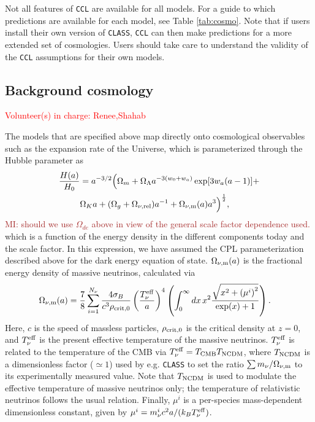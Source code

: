 \documentclass[\docopts]{\docclass}
\newcommand{\todo}[1]{\textcolor{magenta}{To do: #1}}
\newcommand{\vol}[1]{\textcolor{red}{Volunteer(s) in charge: #1}}
\newcommand{\mi}[1]{\textcolor{brown}{MI: #1}}
\newcommand{\ccl}{{\tt CCL}\xspace}
\begin{document}
Not all features of \ccl are available for all models. For a guide to which predictions are available for each model, see Table \ref{tab:cosmo}. Note that if users install their own version of {\tt CLASS}, {\tt CCL} can then make predictions for a more extended set of cosmologies. Users should take care to understand the validity of the {\tt CCL} assumptions for their own models.




\subsection{Background cosmology}
\vol{Renee,Shahab}

The models that are specified above map directly onto cosmological observables such as the expansion rate of the Universe, which is parameterized through the Hubble parameter as
\begin{align}\label{eq:Ha}
\frac{H(a)}{H_0} &= a^{-3/2}\Big(\Omega_{m}+\Omega_{\Lambda} a^{-3(w_0+w_a)}
    \exp[3 w_a (a-1)]+\nonumber \\ &\Omega_{K} a +(\Omega_{g} + \Omega_{\nu, {\rm rel}}) a^{-1} + \Omega_{\nu, {\rm m}}(a)a^3\Big)^{\frac{1}{2}} ,
\end{align}
\mi{should we use $\Omega_{de}$ above in view of the general scale factor dependence used.}
which is a function of the energy density in the different components today and the scale factor. In this expression, we have assumed the CPL parameterization described above for the dark energy equation of state. $\Omega_{\nu, {\rm m}}(a)$ is the fractional energy density of massive neutrinos, calculated via
\begin{align}
\Omega_{\nu, {\rm m}}(a) &= \frac{7}{8}\sum_{i=1}^{N_\nu} \frac{4 \sigma_{B}}{c^3 \rho_{{\rm crit},0}} \left(\frac{T_{\nu}^{\rm eff}}{a}\right)^4  \left(\int_0^{\infty} dx \, x^2 \frac{\sqrt{x^2 + \left(\mu^i\right)^2}}{\exp(x) + 1}\right).
\label{Omnu}
\end{align}
Here, $c$ is the speed of massless particles, $\rho_{{\rm crit},0}$ is the critical density at $z=0$, and $T_{\nu}^{\rm eff}$ is the present effective temperature of the massive neutrinos. $T_{\nu}^{\rm eff}$ is related to the temperature of the CMB via $T_{\nu}^{\rm eff} = T_{\rm CMB} T_{\rm NCDM}$, where $T_{\rm NCDM}$ is a dimensionless factor ($\simeq1$) used by e.g. {\tt CLASS} to set the ratio ${\sum m_\nu}/{\Omega_{\nu, {\rm m}}}$ to its experimentally measured value. Note that $T_{\rm NCDM}$ is used to modulate the effective temperature of massive neutrinos only; the temperature of relativistic neutrinos follows the usual relation. Finally, $\mu^i$ is a per-species mass-dependent dimensionless constant, given by $\mu^i = m_{\nu}^{i}c^2 a / (k_B T_{\nu}^{\rm eff})$.
\end{document}

